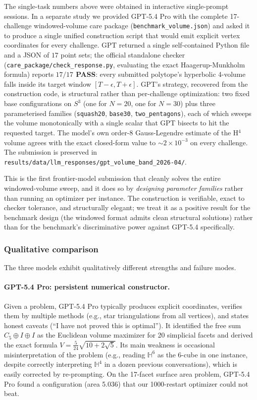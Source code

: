 \documentclass[11pt]{article}
\begin{document}
The single-task numbers above were obtained in interactive
single-prompt sessions.  In a separate study we provided GPT-5.4
Pro with the complete 17-challenge windowed-volume care package
(\texttt{benchmark\_volume.json}) and asked it to produce a single
unified construction script that would emit explicit vertex
coordinates for every challenge.  GPT returned a single
self-contained Python file and a JSON of $17$ point sets; the
official standalone checker
(\texttt{care\_package/check\_response.py}, evaluating the exact
Haagerup-Munkholm formula) reports
\textbf{$17 / 17$ PASS}: every submitted polytope's hyperbolic
4-volume falls inside its target window
$[T - \epsilon, T + \epsilon]$.  GPT's strategy, recovered from
the construction code, is structural rather than per-challenge
optimization: two fixed base configurations on $S^3$ (one for
$N = 20$, one for $N = 30$) plus three parameterised families
(\texttt{squash20}, \texttt{base30}, \texttt{two\_pentagons}),
each of which sweeps the volume monotonically with a single
scalar that GPT bisects to hit the requested target.  The model's
own order-$8$ Gauss-Legendre estimate of the H$^4$ volume agrees
with the exact closed-form value to $\sim 2 \times 10^{-3}$ on
every challenge.  The submission is preserved in
\texttt{results/data/llm\_responses/gpt\_volume\_band\_2026-04/}.

This is the first frontier-model submission that cleanly
solves the entire windowed-volume sweep, and it does so by
\emph{designing parameter families} rather than running an
optimizer per instance.  The construction is verifiable, exact
to checker tolerance, and structurally elegant; we treat it as
a positive result for the benchmark design (the windowed
format admits clean structural solutions) rather than for the
benchmark's discriminative power against GPT-5.4 specifically.

\subsubsection{Qualitative comparison}

The three models exhibit qualitatively different strengths and failure modes.

\paragraph{GPT-5.4 Pro: persistent numerical constructor.}
Given a problem, GPT-5.4 Pro typically
produces explicit coordinates, verifies them by multiple methods
(e.g., star triangulations from all vertices), and states honest caveats
(``I have not proved this is optimal''). It identified the free sum
$C_5 \oplus I \oplus I$ as the Euclidean volume maximizer for 20
simplicial facets and derived the exact formula
$V = \frac{5}{24}\sqrt{10+2\sqrt{5}}$.
Its main weakness is occasional misinterpretation of the problem
(e.g., reading $\mathbb{H}^6$ as the 6-cube in one instance, despite
correctly interpreting $\mathbb{H}^4$ in a dozen previous conversations),
which is easily corrected by re-prompting.
On the 17-facet surface area problem, GPT-5.4 Pro found a configuration
(area 5.036) that our 1000-restart optimizer could not beat.
\end{document}
